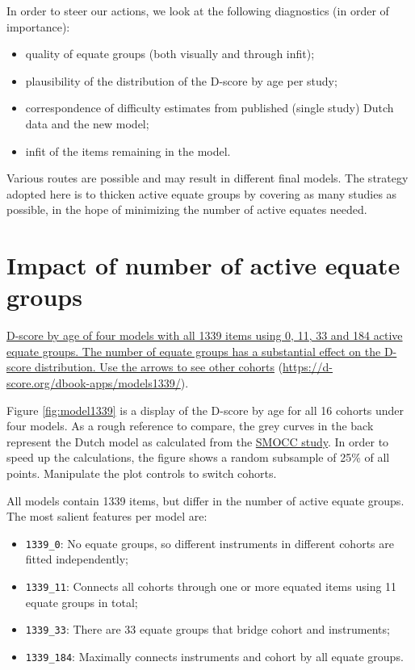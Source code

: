 \documentclass[
]{book}
\providecommand{\tightlist}{%
  \setlength{\itemsep}{0pt}\setlength{\parskip}{0pt}}
\begin{document}
In order to steer our actions, we look at the following diagnostics (in order of importance):

\begin{itemize}
\tightlist
\item
  quality of equate groups (both visually and through infit);
\item
  plausibility of the distribution of the D-score by age per study;
\item
  correspondence of difficulty estimates from published (single study) Dutch data and the new model;
\item
  infit of the items remaining in the model.
\end{itemize}

Various routes are possible and may result in different final models. The strategy adopted here is to thicken active equate groups by covering as many studies as possible, in the hope of minimizing the number of active equates needed.

\hypertarget{sec:impactequate}{%
\section{Impact of number of active equate groups}\label{sec:impactequate}}

\label{fig:model1339}\href{https://d-score.org/dbook-apps/models1339/\#display=by_model_cohort\&nrow=2\&ncol=2\&arr=row\&pg=7\&labels=cohort,model\&sort=cohort;asc,model;asc\&filter=\&sidebar=\&fv=}{D-score by age of four models with all 1339 items using 0, 11, 33 and 184 active equate groups. The number of equate groups has a substantial effect on the D-score distribution. Use the arrows to see other cohorts} (\url{https://d-score.org/dbook-apps/models1339/}).



Figure \ref{fig:model1339} is a display of the D-score by age for all 16 cohorts under four models. As a rough reference to compare, the grey curves in the back represent the Dutch model as calculated from the \href{https://d-score.org/dbook1/sec-smoccstudy.html}{SMOCC study}. In order to speed up the calculations, the figure shows a random subsample of 25\% of all points. Manipulate the plot controls to switch cohorts.

All models contain 1339 items, but differ in the number of active equate groups. The most salient features per model are:

\begin{itemize}
\tightlist
\item
  \texttt{1339\_0}: No equate groups, so different instruments in different cohorts are fitted independently;
\item
  \texttt{1339\_11}: Connects all cohorts through one or more equated items using 11 equate groups in total;
\item
  \texttt{1339\_33}: There are 33 equate groups that bridge cohort and instruments;
\item
  \texttt{1339\_184}: Maximally connects instruments and cohort by all equate groups.
\end{itemize}
\end{document}
